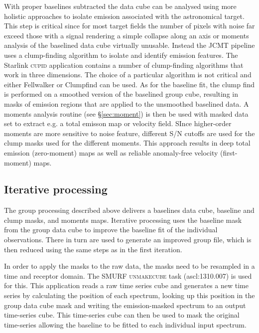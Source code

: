 \documentclass[final,authoryear,5p,times,twocolumn]{elsarticle}
\begin{document}
With proper baselines subtracted  the data cube can be analysed  using more 
holistic approaches to isolate emission associated with the astronomical
target. This step is critical since for most target fields the number of pixels with
noise far exceed those with a signal rendering a simple collapse along an axis 
or moments  analysis of the baselined data cube virtually unusable. Instead
the JCMT pipeline uses a clump-finding algorithm to isolate and identify
emission features. 
The Starlink \textsc{cupid} \citep[][ascl:1311.007]{2007ASPC..376..425B} application contains
a number of clump-finding algorithms that work in three dimensions. 
The choice of a particular algorithm is not critical and either Fellwalker or
Clumpfind \citep[][ascl:1107.014]{1994ApJ...428..693W} can be used.
As for the baseline fit, the clump find is performed on  a smoothed version 
of the baselined group cube, resulting in masks of emission regions that 
are applied to the unsmoothed baselined data. A moments analysis routine 
(see \S \ref{sec:moment}) is then be used with masked data set to extract
e.g. a total emisson map or velocity field. SInce higher-order moments are 
more sensitive to noise feature, different S/N cutoffs are used for the
clump masks used for the different moments. This approach results in deep
total emission (zero-moment) maps as well as reliable anomaly-free 
velocity (first-moment) maps.


\subsection{Iterative processing}

The group processing described above delivers a baselines data cube, 
baseline and clump masks, and moments maps. Iterative processing uses
the baseline mask from the group data cube to improve the baseline fit
of the individual observations. There in turn are used to generate an improved
group file, which is then reduced using the same steps as in the first iteration.

In order to apply the masks to the raw data, the masks need to be resampled
in a time and receptor domain. The SMURF \textsc{unmakecube} task 
(ascl:1310.007) is used for this. This application
reads a raw time series cube and generates a new time series by
calculating the position of each spectrum, looking up this position in
the group data cube mask and writing the emission-masked spectrum to
an output time-series cube. This time-series cube can then be used to
mask the original time-series allowing the baseline to be fitted to
each individual input spectrum.
\end{document}
